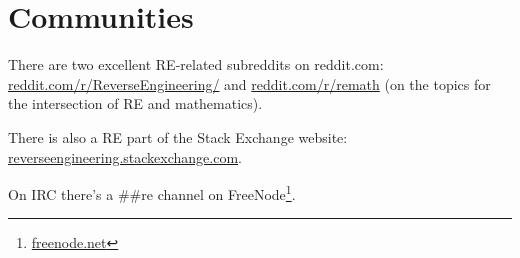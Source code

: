 \chapter{Communities}

There are two excellent \ac{RE}-related subreddits on reddit.com:
\href{http://go.yurichev.com/17027}{reddit.com/r/ReverseEngineering/} and
\href{http://go.yurichev.com/17028}{reddit.com/r/remath}
(on the topics for the intersection of \ac{RE} and mathematics).

There is also a \ac{RE} part of the Stack Exchange website:
\href{http://go.yurichev.com/17029}{reverseengineering.stackexchange.com}.

On IRC there's a \#\#re channel on
FreeNode\footnote{\href{http://go.yurichev.com/17030}{freenode.net}}.

